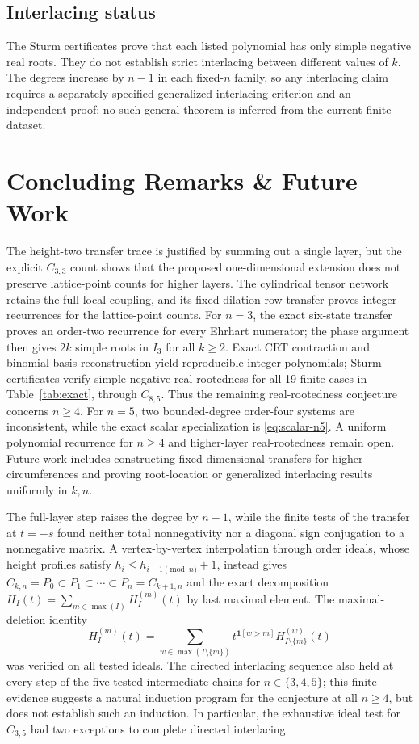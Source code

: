 \documentclass[11pt,a4paper]{article}
\theoremstyle{definition}
\begin{document}
\subsection{Interlacing status}

The Sturm certificates prove that each listed polynomial has only simple
negative real roots. They do not establish strict interlacing between
different values of $k$. The degrees increase by $n-1$ in each fixed-$n$
family, so any interlacing claim requires a separately specified
generalized interlacing criterion and an independent proof; no such
general theorem is inferred from the current finite dataset.

\section{Concluding Remarks \& Future Work}

The height-two transfer trace is justified by summing out a single layer, but the explicit $C_{3,3}$ count shows that the proposed one-dimensional extension does not preserve lattice-point counts for higher layers. The cylindrical tensor network retains the full local coupling, and its fixed-dilation row transfer proves integer recurrences for the lattice-point counts. For $n=3$, the exact six-state transfer proves an order-two recurrence for every Ehrhart numerator; the phase argument then gives $2k$ simple roots in $I_3$ for all $k\ge2$. Exact CRT contraction and binomial-basis reconstruction yield reproducible integer polynomials; Sturm certificates verify simple negative real-rootedness for all 19 finite cases in Table~\ref{tab:exact}, through $C_{8,5}$. Thus the remaining real-rootedness conjecture concerns $n\ge4$. For $n=5$, two bounded-degree order-four systems are inconsistent, while the exact scalar specialization is \eqref{eq:scalar-n5}. A uniform polynomial recurrence for $n\ge4$ and higher-layer real-rootedness remain open. Future work includes constructing fixed-dimensional transfers for higher circumferences and proving root-location or generalized interlacing results uniformly in $k,n$.

The full-layer step raises the degree by $n-1$, while the finite tests of the transfer at $t=-s$ found neither total nonnegativity nor a diagonal sign conjugation to a nonnegative matrix. A vertex-by-vertex interpolation through order ideals, whose height profiles satisfy $h_i\le h_{i-1\pmod n}+1$, instead gives
$C_{k,n}=P_0\subset P_1\subset\cdots\subset P_n=C_{k+1,n}$ and the exact decomposition
$H_I(t)=\sum_{m\in\max(I)}H_I^{(m)}(t)$ by last maximal element. The maximal-deletion identity
\[
H_I^{(m)}(t)=\sum_{w\in\max(I\setminus\{m\})}
t^{\mathbf{1}[w>m]}H_{I\setminus\{m\}}^{(w)}(t)
\]
was verified on all tested ideals. The directed interlacing sequence also held at every step of the five tested intermediate chains for $n\in\{3,4,5\}$; this finite evidence suggests a natural induction program for the conjecture at all $n\ge4$, but does not establish such an induction. In particular, the exhaustive ideal test for $C_{3,5}$ had two exceptions to complete directed interlacing.
\end{document}
